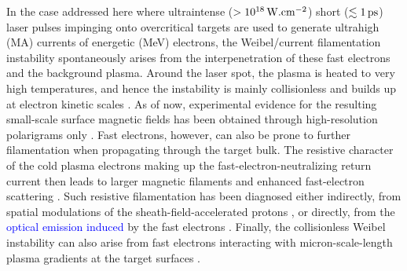 \documentclass[aps,twocolumn,showpacs,superscriptaddress]{revtex4}
\begin{document}
In the case addressed here where ultraintense ($>10^{18}\,\rm W.cm^{-2}$) short ($\lesssim 1\,\rm ps$) laser pulses impinging onto overcritical targets are used to generate ultrahigh (MA) currents of energetic (MeV) electrons, the Weibel/current filamentation instability spontaneously arises from the interpenetration of these fast electrons and the background plasma. Around the laser spot, the plasma is heated to very high temperatures, and hence the instability is mainly collisionless and builds up at electron kinetic scales \cite{PRL_Adam_2006}. As of now, experimental evidence for the resulting small-scale surface magnetic fields has been obtained through high-resolution polarigrams only \cite{PNAS_Mondal_2012}. 
Fast electrons, however, can also be prone to further filamentation when propagating through the target bulk. The resistive character of the cold plasma electrons making up the fast-electron-neutralizing return current \cite{POP_Gremillet_2002} then leads to larger magnetic filaments \cite{JPP_Fiore_2010} and enhanced fast-electron scattering \cite{POP_Yang_2016}. Such resistive filamentation has been diagnosed either indirectly, from spatial modulations of the sheath-field-accelerated protons \cite{PRL_Fuchs_2003, PRL_MacLellan_2013}, or directly, from the \textcolor{blue}{optical emission induced} by the fast electrons  \cite{PRL_Storm_2009}. Finally, the collisionless Weibel instability can also arise from fast electrons interacting with micron-scale-length plasma gradients at the target surfaces \cite{PRE_Wei_2004, PRL_Quinn_2012, PRL_Gode_2017, NJP_Scott_2017}.
\end{document}
